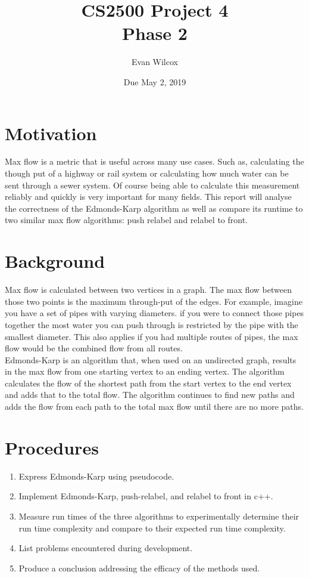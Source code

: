\documentclass[a4paper]{article}
\title{CS2500 Project 4 \\ Phase 2}
\author{Evan Wilcox}
\date{Due May 2, 2019}
\begin{document}
    \maketitle

    \section{Motivation}
    Max flow is a metric that is useful across many use cases. Such as, calculating 
    the though put of a highway or rail system or calculating how much water can be 
    sent through a sewer system. Of course being able to calculate this measurement
    reliably and quickly is very important for many fields. This report will analyse 
    the correctness of the Edmonds-Karp algorithm as well as compare its runtime to 
    two similar max flow algorithms: push relabel and relabel to front.  

    \section{Background}
    Max flow is calculated between two vertices in a graph. The max flow between those
    two points is the maximum through-put of the edges. For example, imagine you have
    a set of pipes with varying diameters. if you were to connect those pipes together
    the most water you can push through is restricted by the pipe with the smallest
    diameter. This also applies if you had multiple routes of pipes, the max flow would
    be the combined flow from all routes. \\

    Edmonds-Karp is an algorithm that, when used on an undirected graph, results in the max
    flow from one starting vertex to an ending vertex. The algorithm calculates the 
    flow of the shortest path from the start vertex to the end vertex and adds that
    to the total flow. The algorithm continues to find new paths and adds the flow
    from each path to the total max flow until there are no more paths.

    
    \section{Procedures}
    \begin{enumerate}

        \item Express Edmonds-Karp using pseudocode.

        \item Implement Edmonds-Karp, push-relabel, and relabel to front in c++.
        
        \item Measure run times of the three algorithms to experimentally determine their
              run time complexity and compare to their expected run time complexity.

        \item List problems encountered during development.

        \item Produce a conclusion addressing the efficacy of the methods used.

    \end{enumerate}
\end{document}
